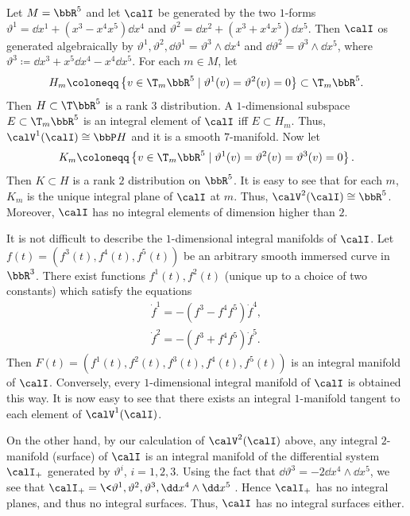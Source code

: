 \begin{example}\label{ex 1.2 Bryant}
    Let $M=\bbR^5$ and let $\calI$ be generated by the two $1$-forms $\vartheta^1=\dd x^1+(x^3-x^4x^5)\dd x^4$ and $\vartheta^2=\dd x^2+(x^3+x^4x^5)\dd x^5$. Then $\calI$ os generated algebraically by $\vartheta^1,\vartheta^2,\dd\vartheta^1=\vartheta^3\wedge\dd x^4$ and $\dd\vartheta^2=\vartheta^3\wedge\dd x^5$, where $\vartheta^3\coloneqq \dd x^3+x^5\dd x^4-x^4\dd x^5$. For each $m\in M$, let 
    \[H_m\coloneqq \left\{v\in\T_m \bbR^5\mid \vartheta^1(v)=\vartheta^2(v)=0\right\}\subset \T_m \bbR^5.\]
    Then $H\subset\T\bbR^5$ is a rank $3$ distribution. A $1$-dimensional subspace $E\subset\T_m\bbR^5$ is an integral element of $\calI$ iff $E\subset H_m$. Thus, $\calV^1(\calI)\cong \bbP H$ and it is a smooth $7$-manifold. Now let 
    \[K_m\coloneqq \left\{v\in\T_m \bbR^5\mid \vartheta^1(v)=\vartheta^2(v)=\vartheta^3(v)=0\right\}.\]
    Then $K\subset H$ is a rank $2$ distribution on $\bbR^5$. It is easy to see that for each $m$, $K_m$ is the unique integral plane of $\calI$ at $m$. Thus, $\calV^2(\calI)\cong\bbR^5$. Moreover, $\calI$ has no integral elements of dimension higher than $2$.

    It is not difficult to describe the $1$-dimensional integral manifolds of $\calI$. Let $f(t)=(f^3(t),f^4(t),f^5(t))$ be an arbitrary smooth immersed curve in $\bbR^3$. There exist functions $f^1(t),f^2(t)$ (unique up to a choice of two constants) which satisfy the equations 
    \begin{gather}
        \dot f^1=-(f^3-f^4f^5)\dot f^4,\\
        \dot f^2=-(f^3+f^4f^5)\dot f^5.
    \end{gather}
    Then $F(t)=(f^1(t),f^2(t),f^3(t),f^4(t),f^5(t))$ is an integral manifold of $\calI$. Conversely, every $1$-dimensional integral manifold of $\calI$ is obtained this way. It is now easy to see that there exists an integral $1$-manifold tangent to each element of $\calV^1(\calI)$.

    On the other hand, by our calculation of $\calV^2(\calI)$ above, any integral $2$-manifold (surface) of $\calI$ is an integral manifold of the differential system $\calI_+$ generated by $\vartheta^i$, $i=1,2,3$. Using the fact that $\dd\vartheta^3=-2\dd x^4\wedge\dd x^5$, we see that $\calI_+=\<\vartheta^1,\vartheta^2,\vartheta^3,\dd x^4\wedge\dd x^5\>$. Hence $\calI_+$ has no integral planes, and thus no integral surfaces. Thus, $\calI$ has no integral surfaces either.
\end{example}

